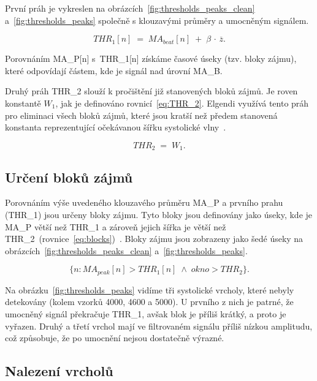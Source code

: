 První práh je vykreslen na obrázcích~\ref{fig:thresholds_peaks_clean} a~\ref{fig:thresholds_peaks} společně s klouzavými průměry a umocněným signálem.

\begin{equation}
	THR_1[n] \;=\; MA_{beat}[n] \;+\; \beta \,\cdot\, \overline{z}.
	\label{eq:THR_1}
\end{equation}

Porovnáním \acs{MA_P}[n] s~\acs{THR_1}[n] získáme časové úseky (tzv. bloky zájmu), které odpovídají částem, kde je signál nad úrovní \acs{MA_B}.

Druhý práh \acs{THR_2} slouží k pročištění již stanovených bloků zájmů.
Je roven konstantě \(W_1\), jak je definováno rovnicí~\ref{eq:THR_2}.
Elgendi využívá tento práh pro eliminaci všech bloků zájmů, které jsou kratší než předem stanovená konstanta reprezentující očekávanou šířku systolické vlny~\cite{Elgendi2013}.

\begin{equation}
	THR_2 \;=\; W_1.
	\label{eq:THR_2}
\end{equation}

\subsection*{Určení bloků zájmů}
\label{sec:blocks}

Porovnáním výše uvedeného klouzavého průměru \acs{MA_P} a prvního prahu (\acs{THR_1}) jsou určeny bloky zájmu.
Tyto bloky jsou definovány jako úseky, kde je \acs{MA_P} větší než \acs{THR_1} a zároveň jejich šířka je větší než \acs{THR_2}~(rovnice~\ref{eq:blocks})~\cite{Elgendi2013}.
Bloky zájmu jsou zobrazeny jako šedé úseky na obrázcích~\ref{fig:thresholds_peaks_clean} a~\ref{fig:thresholds_peaks}.

\begin{equation}
	\{n : MA_{peak}[n] > THR_1[n] \; \land \; okno > THR_2\}.
	\label{eq:blocks}
\end{equation}

Na obrázku~\ref{fig:thresholds_peaks} vidíme tři systolické vrcholy, které nebyly detekovány (kolem vzorků 4000, 4600 a 5000).
U prvního z nich je patrné, že umocněný signál překračuje \acs{THR_1}, avšak blok je příliš krátký, a proto je vyřazen.
Druhý a třetí vrchol mají ve filtrovaném signálu příliš nízkou amplitudu, což způsobuje, že po umocnění nejsou dostatečně výrazné.

\subsection*{Nalezení vrcholů}
\label{sec:peaks}

